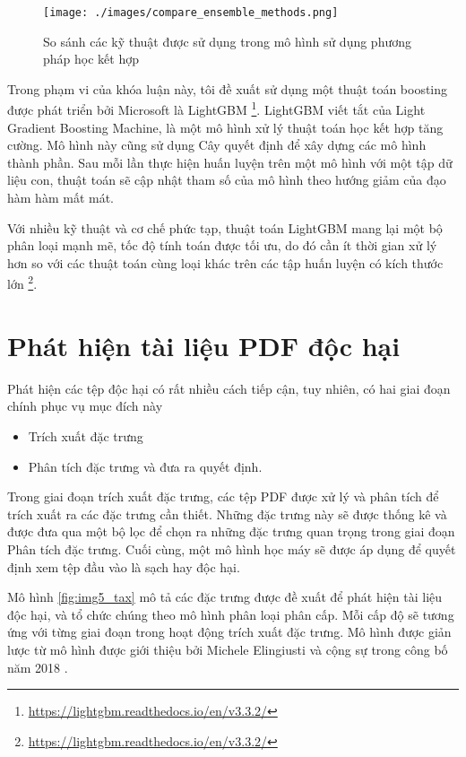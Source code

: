 \documentclass[./../main.tex]{subfiles}
\begin{document}
\begin{figure}[ht!]
	\centering
	\texttt{[image: ./images/compare\_ensemble\_methods.png]}
	\caption{So sánh các kỹ thuật được sử dụng trong mô hình sử dụng phương pháp học kết hợp\protect\footnotemark}
	\label{fig:compare_ensemble_methods}
\end{figure}


Trong phạm vi của khóa luận này, tôi đề xuất sử dụng một thuật toán boosting được phát triển bởi Microsoft là LightGBM \footnote{\url{https://lightgbm.readthedocs.io/en/v3.3.2/}}. LightGBM viết tắt của Light Gradient Boosting Machine, là một mô hình xử lý thuật toán học kết hợp tăng cường. Mô hình này cũng sử dụng Cây quyết định để xây dựng các mô hình thành phần. Sau mỗi lần thực hiện huấn luyện trên một mô hình với một tập dữ liệu con, thuật toán sẽ cập nhật tham số của mô hình theo hướng giảm của đạo hàm hàm mất mát.

Với nhiều kỹ thuật và cơ chế phức tạp, thuật toán LightGBM mang lại một bộ phân loại mạnh mẽ, tốc độ tính toán được tối ưu, do đó cần ít thời gian xử lý hơn so với các thuật toán cùng loại khác trên các tập huấn luyện có kích thước lớn \footnote{\url{https://lightgbm.readthedocs.io/en/v3.3.2/}}.

\section{Phát hiện tài liệu PDF độc hại}

Phát hiện các tệp độc hại có rất nhiều cách tiếp cận, tuy nhiên, có hai giai đoạn chính phục vụ mục đích này

\begin{itemize}
	\item Trích xuất đặc trưng
	\item Phân tích đặc trưng và đưa ra quyết định.
\end{itemize}


Trong giai đoạn trích xuất đặc trưng, các tệp PDF được xử lý và phân tích để trích xuất ra các đặc trưng cần thiết. Những đặc trưng này sẽ được thống kê và được đưa qua một bộ lọc để chọn ra những đặc trưng quan trọng trong giai đoạn Phân tích đặc trưng. Cuối cùng, một mô hình học máy sẽ được áp dụng để quyết định xem tệp đầu vào là sạch hay độc hại.

Mô hình \ref{fig:img5_tax} mô tả các đặc trưng được đề xuất để phát hiện tài liệu độc hại, và tổ chức chúng theo mô hình phân loại phân cấp. Mỗi cấp độ sẽ tương ứng với từng giai đoạn trong hoạt động trích xuất đặc trưng. Mô hình được giản lược từ mô hình được giới thiệu bởi Michele Elingiusti và cộng sự trong công bố năm 2018 \cite{tax}.
\end{document}
